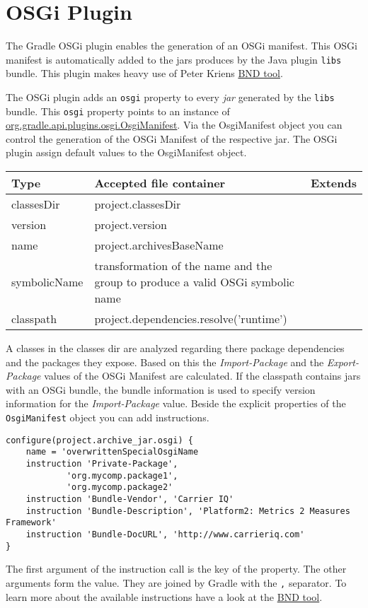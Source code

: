 \chapter{OSGi Plugin} %
\label{cha:osgi_plugin}
The Gradle OSGi plugin enables the generation of an OSGi manifest. This OSGi manifest is automatically added to the jars produces by the Java plugin \texttt{libs} bundle. This plugin makes heavy use of Peter Kriens \href{http://www.aqute.biz/Code/Bnd}{BND tool}. 

The OSGi plugin adds an \texttt{osgi} property to every \emph{jar} generated by the \texttt{libs} bundle. This \texttt{osgi} property points to an instance of \href{\API plugins.osgi/OsgiManifest.html}{org.gradle.api.plugins.osgi.OsgiManifest}. Via the OsgiManifest object you can control the generation of the OSGi Manifest of the respective jar. The OSGi plugin assign default values to the OsgiManifest object. 
\begin{center}
	\begin{tabular}{|l|l|l|} \hline
		Type & Accepted file container & Extends \\ \hline
		classesDir & project.classesDir \\ \hline
		version & project.version \\ \hline
		name & project.archivesBaseName \\ \hline
		symbolicName & transformation of the name and the group to produce a valid OSGi symbolic name \\ \hline		
		classpath & project.dependencies.resolve('runtime') \\ \hline		
	\end{tabular}
\end{center}
A classes in the classes dir are analyzed regarding there package dependencies and the packages they expose. Based on this the \emph{Import-Package} and the \emph{Export-Package} values of the OSGi Manifest are calculated. If the classpath contains jars with an OSGi bundle, the bundle information is used to specify version information for the \emph{Import-Package} value. Beside the explicit properties of the \texttt{OsgiManifest} object you can add instructions. 
\begin{Verbatim}
configure(project.archive_jar.osgi) {
    name = 'overwrittenSpecialOsgiName
    instruction 'Private-Package',
            'org.mycomp.package1',
            'org.mycomp.package2'
    instruction 'Bundle-Vendor', 'Carrier IQ'
    instruction 'Bundle-Description', 'Platform2: Metrics 2 Measures Framework'
    instruction 'Bundle-DocURL', 'http://www.carrieriq.com'
}
\end{Verbatim}
The first argument of the instruction call is the key of the property. The other arguments form the value. They are joined by Gradle with the \texttt{,} separator. To learn more about the available instructions have a look at the \href{http://www.aqute.biz/Code/Bnd}{BND tool}.
